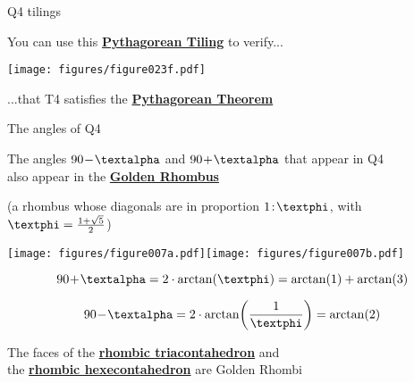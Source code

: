 \documentclass[14pt]{beamer}
\begin{document}

    \begin{frame}{Q4 tilings}
        \begin{center}
            You can use this \textbf{\href{https://en.wikipedia.org/wiki/Pythagorean_tiling}{Pythagorean Tiling}} to verify...

            \bigskip \bigskip

            \texttt{[image: figures/figure023f.pdf]}

            \bigskip \bigskip

            ...that T4 satisfies the \textbf{\href{https://en.wikipedia.org/wiki/Pythagorean_theorem}{Pythagorean Theorem}}
        \end{center}
    \end{frame}


    \begin{frame}{The angles of Q4}
        \begin{center}
            The angles $90\!-\!\text{\textalpha}$ and $90\!+\!\text{\textalpha}$ that appear in Q4\\also appear in the \textbf{\href{https://en.wikipedia.org/wiki/Golden_rhombus}{Golden Rhombus}}

            \medskip

            {\footnotesize(a rhombus whose diagonals are in proportion $1\!:\!\text{\textphi}$, with $\text{\textphi} =\tfrac{1+\sqrt{5}}{2}$)}

            \bigskip

            \begin{minipage}{16ex}\vspace{2ex}
                \texttt{[image: figures/figure007a.pdf]}\texttt{[image: figures/figure007b.pdf]}\\
            \end{minipage}\quad\begin{minipage}{25ex}
                \footnotesize
                $$90\!+\!\text{\textalpha} = 2\cdot\arctan{\!\left(\text{\textphi}\right)} = \arctan{\!\left(1\right)} + \arctan{\!\left(3\right)}$$

                $$90\!-\!\text{\textalpha} = 2\cdot\arctan{\!\left(\frac{1}{\text{\textphi}}\right)} = \arctan{\!\left(2\right)}$$

                \bigskip
            \end{minipage}

            {\footnotesize The faces of the \textbf{\href{https://en.wikipedia.org/wiki/Rhombic_triacontahedron}{rhombic triacontahedron}} and\\the \textbf{\href{https://en.wikipedia.org/wiki/Rhombic_hexecontahedron}{rhombic hexecontahedron}} are Golden Rhombi}
        \end{center}
    \end{frame}
\end{document}
